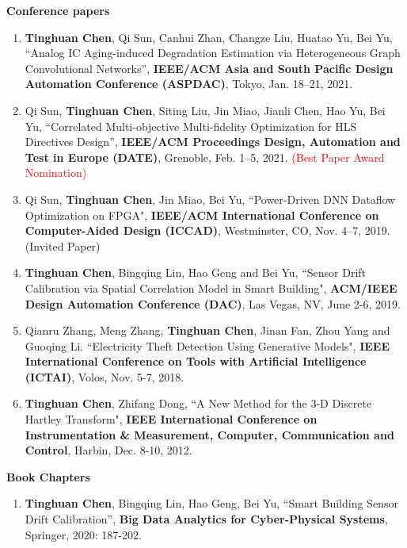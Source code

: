\documentclass[letterpaper,11pt]{article}%
\begin{document}
\textbf{Conference papers}

\begin{enumerate}[(1)]


\item \textbf{Tinghuan Chen}, Qi Sun, Canhui Zhan, Changze Liu, Huatao Yu, Bei Yu, ``Analog IC Aging-induced Degradation Estimation via Heterogeneous Graph Convolutional Networks'', \textbf{IEEE/ACM Asia and South Pacific Design Automation Conference (ASPDAC)}, Tokyo, Jan. 18–21, 2021.

\item Qi Sun, \textbf{Tinghuan Chen}, Siting Liu, Jin Miao, Jianli Chen, Hao Yu, Bei Yu, ``Correlated Multi-objective Multi-fidelity Optimization for HLS Directives Design'', \textbf{IEEE/ACM Proceedings Design, Automation and Test in Europe (DATE)}, Grenoble, Feb. 1–5, 2021. \textcolor{red}{(Best Paper Award Nomination)}


\item Qi Sun, \textbf{Tinghuan Chen}, Jin Miao, Bei Yu, ``Power-Driven DNN Dataflow Optimization on FPGA", \textbf{IEEE/ACM International Conference on Computer-Aided Design (ICCAD)}, Westminster, CO, Nov. 4–7, 2019. (Invited Paper)

\item \textbf{Tinghuan Chen}, Bingqing Lin, Hao Geng and Bei Yu, ``Sensor Drift Calibration via Spatial Correlation Model in Smart Building", \textbf{ACM/IEEE Design Automation Conference (DAC)}, Las Vegas, NV, June 2-6, 2019.



\item Qianru Zhang, Meng Zhang, \textbf{Tinghuan Chen}, Jinan Fan, Zhou Yang and Guoqing Li. ``Electricity Theft Detection Using Generative Models", \textbf{IEEE International Conference on Tools with Artificial Intelligence (ICTAI)}, Volos, Nov. 5-7, 2018.


\item \textbf{Tinghuan Chen}, Zhifang Dong, ``A New Method for the 3-D Discrete Hartley Transform", \textbf{IEEE International Conference on Instrumentation \& Measurement, Computer, Communication and Control}, Harbin, Dec. 8-10, 2012.

\end{enumerate}

\textbf{Book Chapters}

\begin{enumerate}[(1)]


\item \textbf{Tinghuan Chen}, Bingqing Lin, Hao Geng, Bei Yu, ``Smart Building Sensor Drift Calibration'', \textbf{Big Data Analytics for Cyber-Physical Systems}, Springer, 2020: 187-202.



\end{enumerate}
\end{document}
